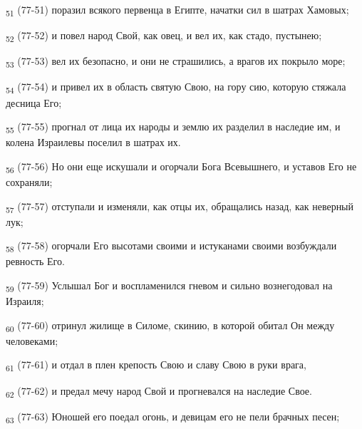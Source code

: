 \begin{tcolorbox}
\textsubscript{51} (77-51) поразил всякого первенца в Египте, начатки сил в шатрах Хамовых;
\end{tcolorbox}
\begin{tcolorbox}
\textsubscript{52} (77-52) и повел народ Свой, как овец, и вел их, как стадо, пустынею;
\end{tcolorbox}
\begin{tcolorbox}
\textsubscript{53} (77-53) вел их безопасно, и они не страшились, а врагов их покрыло море;
\end{tcolorbox}
\begin{tcolorbox}
\textsubscript{54} (77-54) и привел их в область святую Свою, на гору сию, которую стяжала десница Его;
\end{tcolorbox}
\begin{tcolorbox}
\textsubscript{55} (77-55) прогнал от лица их народы и землю их разделил в наследие им, и колена Израилевы поселил в шатрах их.
\end{tcolorbox}
\begin{tcolorbox}
\textsubscript{56} (77-56) Но они еще искушали и огорчали Бога Всевышнего, и уставов Его не сохраняли;
\end{tcolorbox}
\begin{tcolorbox}
\textsubscript{57} (77-57) отступали и изменяли, как отцы их, обращались назад, как неверный лук;
\end{tcolorbox}
\begin{tcolorbox}
\textsubscript{58} (77-58) огорчали Его высотами своими и истуканами своими возбуждали ревность Его.
\end{tcolorbox}
\begin{tcolorbox}
\textsubscript{59} (77-59) Услышал Бог и воспламенился гневом и сильно вознегодовал на Израиля;
\end{tcolorbox}
\begin{tcolorbox}
\textsubscript{60} (77-60) отринул жилище в Силоме, скинию, в которой обитал Он между человеками;
\end{tcolorbox}
\begin{tcolorbox}
\textsubscript{61} (77-61) и отдал в плен крепость Свою и славу Свою в руки врага,
\end{tcolorbox}
\begin{tcolorbox}
\textsubscript{62} (77-62) и предал мечу народ Свой и прогневался на наследие Свое.
\end{tcolorbox}
\begin{tcolorbox}
\textsubscript{63} (77-63) Юношей его поедал огонь, и девицам его не пели брачных песен;
\end{tcolorbox}
